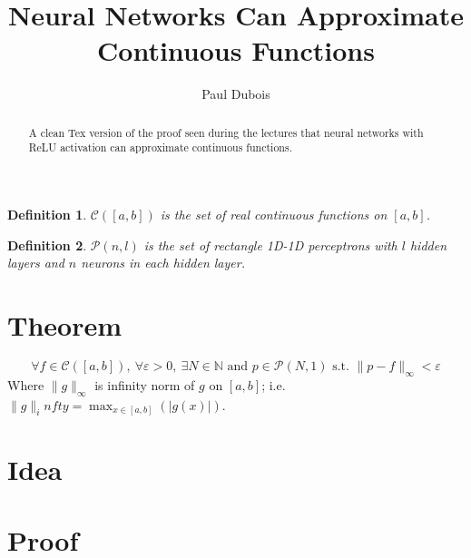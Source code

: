 \documentclass[]{article}
\title{Neural Networks Can Approximate Continuous Functions}
\author{Paul Dubois}
\date{}
\newtheorem{definition}{Definition}
\begin{document}
\maketitle

\begin{abstract}
	A clean Tex version of the proof seen during the lectures that neural networks with ReLU activation can approximate continuous functions.
\end{abstract}

\begin{definition}
	$\mathcal{C}\left( \left[ a,b \right] \right)$ is the set of real continuous functions on $\left[ a,b \right]$.
\end{definition}
\begin{definition}
	$\mathcal{P}\left( n,l \right)$ is the set of rectangle 1D-1D perceptrons with $l$ hidden layers and $n$ neurons in each hidden layer.
\end{definition}

\section{Theorem}
$$\forall f \in \mathcal{C}(\left[ a,b \right]), \ \forall \varepsilon > 0, \ \exists N \in \mathbb{N} \text{ and } p \in \mathcal{P}(N,1) \text{ s.t. } \|p-f\|_\infty < \varepsilon$$
Where $\|g\|_\infty$ is infinity norm of $g$ on $\left[ a,b \right]$; i.e. $\|g\|_infty = \max_{x \in \left[ a,b \right]}(|g(x)|)$.

\section{Idea}

\section{Proof}
\end{document}
